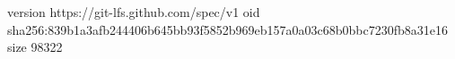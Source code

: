 version https://git-lfs.github.com/spec/v1
oid sha256:839b1a3afb244406b645bb93f5852b969eb157a0a03c68b0bbc7230fb8a31e16
size 98322
